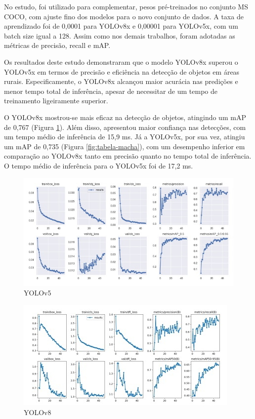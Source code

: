 No estudo, foi utilizado para complementar, pesos pré-treinados no conjunto MS COCO, com ajuste fino dos modelos para o novo conjunto de dados. A taxa de aprendizado foi de 0,0001 para YOLOv8x e 0,00001 para YOLOv5x, com um batch size igual a 128. Assim como nos demais trabalhos, foram adotadas as métricas de precisão, recall e mAP.

Os resultados deste estudo demonstraram que o modelo YOLOv8x superou o YOLOv5x em termos de precisão e eficiência na detecção de objetos em áreas rurais. Especificamente, o YOLOv8x alcançou maior acurácia nas predições e menor tempo total de inferência, apesar de necessitar de um tempo de treinamento ligeiramente superior.

O YOLOv8x mostrou-se mais eficaz na detecção de objetos, atingindo um mAP de 0,767 (Figura \ref{fig:yolov5}). Além disso, apresentou maior confiança nas detecções, com um tempo médio de inferência de 15,9 ms. Já a YOLOv5x, por sua vez, atingiu um mAP de 0,735 (Figura \ref{fig:tabela-macha}), com um desempenho inferior em comparação ao YOLOv8x tanto em precisão quanto no tempo total de inferência. O tempo médio de inferência para o YOLOv5x foi de 17,2 ms.
\begin{figure}[!h]
    \center
    \begin{minipage}{0.9\linewidth}
        \center
        \captionsetup{justification=centering,margin=0.5cm,font=small}
        \includegraphics[width=0.7\linewidth]{img/cap3/yolov5artigo.jpeg}
        \caption{YOLOv5 \cite{diascomparaccao}}
        \label{fig:yolov5}
    \end{minipage}
\end{figure}

\begin{figure}[!h]
    \center
    \begin{minipage}{0.9\linewidth}
        \center
        \captionsetup{justification=centering,margin=0.5cm,font=small}
        \includegraphics[width=0.7\linewidth]{img/cap3/yolov8artigo.jpeg}
        \caption{YOLOv8 \cite{diascomparaccao}}
        \label{fig:yolov8}
    \end{minipage}
\end{figure}

